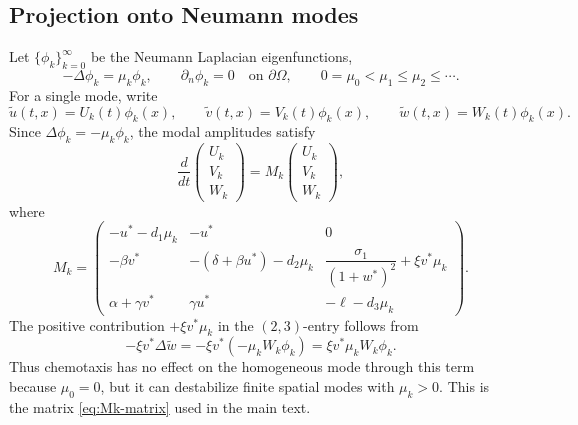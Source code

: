 \documentclass[a4paper,fleqn,longmktitle]{cas-sc}
\theoremstyle{plain}
\theoremstyle{definition}
\numberwithin{equation}{section}
\begin{document}
\subsection{Projection onto Neumann modes}
\label{app:rh-neumann-modes}
Let \(\{\phi_k\}_{k=0}^{\infty}\) be the Neumann Laplacian eigenfunctions,
\[
-\Delta\phi_k=\mu_k\phi_k,\qquad
\partial_n\phi_k=0\quad\text{on }\partial\Omega,
\qquad
0=\mu_0<\mu_1\le\mu_2\le\cdots .
\]
For a single mode, write
\[
\widetilde u(t,x)=U_k(t)\phi_k(x),\qquad
\widetilde v(t,x)=V_k(t)\phi_k(x),\qquad
\widetilde w(t,x)=W_k(t)\phi_k(x).
\]
Since \(\Delta\phi_k=-\mu_k\phi_k\), the modal amplitudes satisfy
\[
\frac{d}{dt}
\begin{pmatrix}
U_k\\ V_k\\ W_k
\end{pmatrix}
=
M_k
\begin{pmatrix}
U_k\\ V_k\\ W_k
\end{pmatrix},
\]
where
\begin{equation}\label{eq:app-Mk}
M_k=
\begin{pmatrix}
-u^*-d_1\mu_k & -u^* & 0\\[2mm]
-\beta v^* & -(\delta+\beta u^*)-d_2\mu_k &
\dfrac{\sigma_1}{(1+w^*)^2}+\xi v^*\mu_k\\[3mm]
\alpha+\gamma v^* & \gamma u^* & -\ell-d_3\mu_k
\end{pmatrix}.
\end{equation}
The positive contribution \(+\xi v^*\mu_k\) in the \((2,3)\)-entry follows from
\[
-\xi v^*\Delta\widetilde w
=
-\xi v^*(-\mu_k W_k\phi_k)
=
\xi v^*\mu_k W_k\phi_k .
\]
Thus chemotaxis has no effect on the homogeneous mode through this term because
\(\mu_0=0\), but it can destabilize finite spatial modes with \(\mu_k>0\). This is
the matrix \eqref{eq:Mk-matrix} used in the main text.
\end{document}
